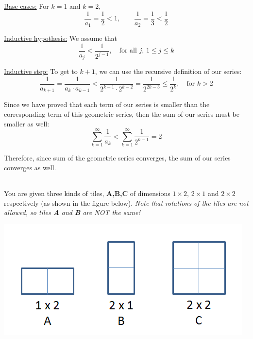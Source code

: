 \documentclass[11pt]{article}
\newif\ifsolutions
\begin{document}
\begin{qunlist}
{\underline{Base cases:} For $k=1$ and $k=2$, 
\[ 
\frac{1}{a_1} = \frac{1}{2} < 1, \qquad 
\frac{1}{a_2} = \frac{1}{3} < \frac{1}{2} 
\]

\underline{Inductive hypothesis:} We assume that 
\[ \frac{1}{a_j} < \frac{1}{2^{j-1}}, \quad \text{for all $j$, } 1 \leq j \leq k \]

\underline{Inductive step:} To get to $k+1$, we can use the recursive definition of our series:
\[ 
\frac{1}{a_{k+1}} = \frac{1}{a_k \cdot a_{k-1}} 
< \frac{1}{2^{k-1} \cdot 2^{k-2}} = \frac{1}{2^{2k-3}} 
\leq \frac{1}{2^k}, \quad \text{for } k > 2 
\]

Since we have proved that each term of our series is smaller than 
the corresponding term of this geometric series, then the sum of our series must be smaller as well:
\[ \sum_{k=1}^{\infty} \frac{1}{a_k} < \sum_{k=1}^{\infty} \frac{1}{2^{k-1}} = 2 \]

Therefore, since sum of the geometric series converges, the sum of our series converges as well.
}
\fi


%
%
%


\pagebreak

 \\
You are given three kinds of tiles, \textbf{A,B,C} of dimensions $1 \times 2$, $2 \times 1$
and $2 \times 2$ respectively (as shown in the figure below).
\textit{Note that rotations of the tiles are not allowed, so tiles \textbf{A} and \textbf{B} are NOT the same!}

\begin{minipage}{\linewidth}
\centering
\includegraphics[scale=0.6]{resources/figures/tile.png}
\end{minipage}


\end{qunlist}
\end{document}
